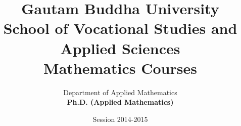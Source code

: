 \documentclass{article}
\begin{document}
\title{Gautam Buddha University \\ School of Vocational Studies and Applied Sciences\\ Mathematics Courses}
\author{Department of Applied Mathematics \\ \textbf{Ph.D. (Applied Mathematics)}}
\date{Session 2014-2015}
\maketitle
\tableofcontents
\newpage
\end{document}
